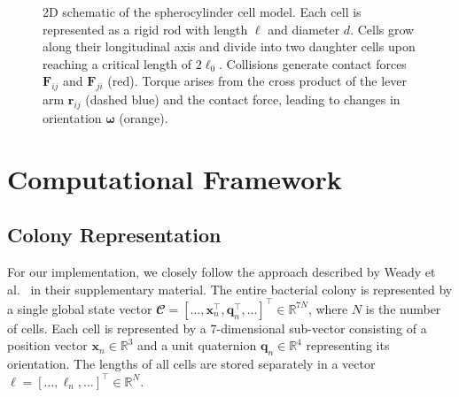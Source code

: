 \documentclass[conference]{IEEEtran}
\begin{document}
\begin{figure}[H]
    \caption{2D schematic of the spherocylinder cell model. Each cell is represented as a rigid rod with length $\ell$ and diameter $d$. Cells grow along their longitudinal axis and divide into two daughter cells upon reaching a critical length of $2\ell_0$. Collisions generate contact forces $\mathbf{F}_{ij}$ and $\mathbf{F}_{ji}$ (red). Torque arises from the cross product of the lever arm $\mathbf{r}_{ij}$ (dashed blue) and the contact force, leading to changes in orientation $\boldsymbol{\omega}$ (orange).}
    \label{fig:spherocylinder_model}

\end{figure}

\newpage

\section{Computational Framework}

\subsection{Colony Representation}

For our implementation, we closely follow the approach described by Weady et al.~\cite{Weady2024SM} in their supplementary material. The entire bacterial colony is represented by a single global state vector $\mathbfcal{C} = [\dots, \mathbf{x}_n^\top, \mathbf{q}_n^\top, \dots]^\top \in \mathbb{R}^{7N}$, where $N$ is the number of cells. Each cell is represented by a 7-dimensional sub-vector consisting of a position vector $\mathbf{x}_n \in \mathbb{R}^3$ and a unit quaternion $\mathbf{q}_n \in \mathbb{R}^4$ representing its orientation. The lengths of all cells are stored separately in a vector $\boldsymbol{\ell} = [\dots, \ell_n, \dots]^\top \in \mathbb{R}^{N}$.
\end{document}
